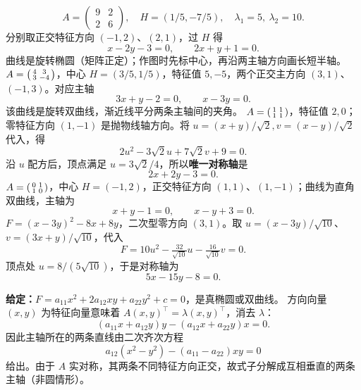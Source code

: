 \[
A=\begin{pmatrix}9&2\\2&6\end{pmatrix},\quad H=(1/5,-7/5),
\quad\lambda_1=5,\ \lambda_2=10.
\]
分别取正交特征方向 $(-1,2)$、$(2,1)$，过 $H$ 得
\[\boxed{x-2y-3=0,\qquad 2x+y+1=0}.\]
曲线是旋转椭圆（矩阵正定）；作图时先标中心，再沿两主轴方向画长短半轴。
$A=\begin{psmallmatrix}4&3\\3&-4\end{psmallmatrix}$，中心 $H=(3/5,1/5)$，特征值 $5,-5$，两个正交主方向 $(3,1)$、$(-1,3)$。对应主轴
\[\boxed{3x+y-2=0,\qquad x-3y=0}.\]
该曲线是旋转双曲线，渐近线平分两条主轴间的夹角。
$A=\begin{psmallmatrix}1&1\\1&1\end{psmallmatrix}$，特征值 $2,0$；零特征方向 $(1,-1)$ 是抛物线轴方向。将 $u=(x+y)/\sqrt2,v=(x-y)/\sqrt2$ 代入，得
\[2u^2-3\sqrt2u+7\sqrt2v+9=0.
\]
沿 $u$ 配方后，顶点满足 $u=3\sqrt2/4$，所以\textbf{唯一对称轴}是
\[\boxed{2x+2y-3=0}.\]
$A=\begin{psmallmatrix}0&1\\1&0\end{psmallmatrix}$，中心 $H=(-1,2)$，正交特征方向 $(1,1)$、$(1,-1)$；曲线为直角双曲线，主轴为
\[\boxed{x+y-1=0,\qquad x-y+3=0}.\]
$F=(x-3y)^2-8x+8y$，二次型零方向 $(3,1)$。取 $u=(x-3y)/\sqrt{10}$、$v=(3x+y)/\sqrt{10}$，代入
\[F=10u^2-\tfrac{32}{\sqrt{10}}u-\tfrac{16}{\sqrt{10}}v=0.
\]
顶点处 $u=8/(5\sqrt{10})$，于是对称轴为
\[\boxed{5x-15y-8=0}.\]

\textbf{给定：}$F=a_{11}x^2+2a_{12}xy+a_{22}y^2+c=0$，是真椭圆或双曲线。
方向向量 $(x,y)$ 为特征向量意味着 $A(x,y)^\top=\lambda(x,y)^\top$，消去 $\lambda$：
\[
(a_{11}x+a_{12}y)y-(a_{12}x+a_{22}y)x=0.
\]
因此主轴所在的两条直线由二次齐次方程
\[\boxed{a_{12}(x^2-y^2)-(a_{11}-a_{22})xy=0}\]
给出。由于 $A$ 实对称，其两条不同特征方向正交，故式子分解成互相垂直的两条主轴（非圆情形）。

